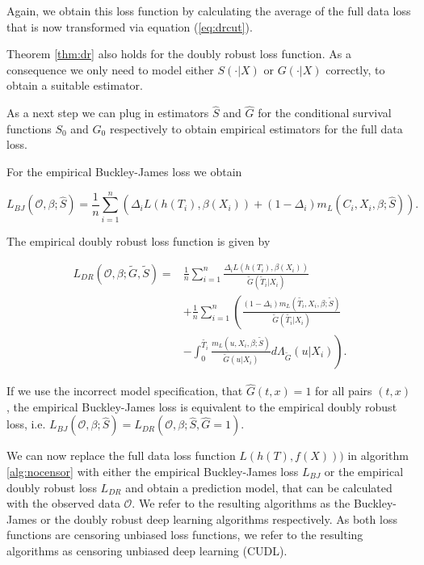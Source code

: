 \documentclass[12pt, a4paper]{article}
\theoremstyle{definition}
\theoremstyle{plain}
\numberwithin{equation}{section}
\numberwithin{figure}{section}
\numberwithin{table}{section}
\begin{document}
	Again, we obtain this loss function by calculating the average of the full data loss that is now transformed via equation (\ref{eq:drcut}).
	
	Theorem \ref{thm:dr} also holds for the doubly robust loss function.
	As a consequence we only need to model either $S(\cdot\vert X)$ or $G(\cdot\vert X)$ correctly, to obtain a suitable estimator.
	
	As a next step we can plug in estimators $\hat{S}$ and $\hat{G}$ for the conditional survival functions $S_0$ and $G_0$ respectively to obtain empirical estimators for the full data loss.
	
	For the empirical Buckley-James loss we obtain
	
	\begin{equation*}
	L_{BJ}(\mathcal{O}, \beta; \hat{S}) = \frac{1}{n} \sum_{i=1}^n \left( \Delta_i L(h(T_i), \beta(X_i))+(1-\Delta_i)m_L(C_i, X_i, \beta; \hat{S})\right).
	\end{equation*}
	
	The empirical doubly robust loss function is given by
	
	\begin{equation*}
	\begin{split}
	L_{DR}(\mathcal{O}, \beta; \tilde{G}, \tilde{S}) = & \frac{1}{n} \sum_{i=1}^n \frac{\Delta_i L(h(T_i),\beta(X_i))}{\tilde{G}(\tilde{T}_i\vert X_i)}\\
	~ & + \frac{1}{n} \sum_{i=1}^n \left(\frac{(1-\Delta_i)m_L(\tilde{T_i}, X_i, \beta; \tilde{S})}{\tilde{G}(\tilde{T_i}\vert X_i)} \right.\\
	& - \left. \int _0^{\tilde{T_i}} \frac{m_L(u, X_i, \beta; \tilde{S})}{\tilde{G}(u \vert X_i)} d \Lambda_{\tilde{G}}(u \vert X_i) \right).
	\end{split}
	\end{equation*}
	
	If we use the incorrect model specification, that $\hat{G}(t,x)=1$ for all pairs $(t,x)$, the empirical  Buckley-James loss is equivalent to the empirical doubly robust loss, i.e. $L_{BJ}(\mathcal{O}, \beta; \hat{S})=L_{DR}(\mathcal{O}, \beta; \hat{S}, \hat{G} = 1)$.
	
	We can now replace the full data loss function $L(h(T), f(X)))$ in algorithm \ref{alg:nocensor} with either the empirical Buckley-James loss $L_{BJ}$ or the empirical doubly robust loss $L_{DR}$ and obtain a prediction model, that can be calculated with the observed data $\mathcal{O}$.
	We refer to the resulting algorithms as the Buckley-James or the doubly robust deep learning algorithms respectively.
	As both loss functions are censoring unbiased loss functions, we refer to the resulting algorithms as censoring unbiased deep learning (CUDL). 
	
\end{document}
